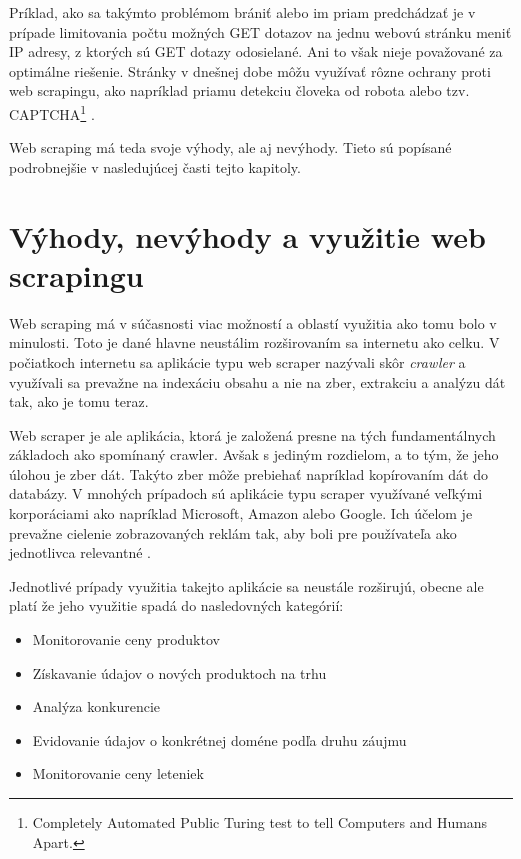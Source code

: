 Príklad, ako sa takýmto problémom brániť alebo im priam predchádzať je v prípade limitovania počtu možných GET dotazov na jednu webovú stránku meniť IP adresy, z ktorých sú GET dotazy odosielané. Ani to však nieje považované za optimálne riešenie. Stránky v dnešnej dobe môžu využívať rôzne ochrany proti web scrapingu, ako napríklad priamu detekciu človeka od robota alebo tzv. CAPTCHA\footnote{Completely Automated Public Turing test to tell Computers and Humans Apart.} \cite{JanCurna:online} .

Web scraping má teda svoje výhody, ale aj nevýhody. Tieto sú popísané podrobnejšie v nasledujúcej časti tejto kapitoly.

\section{Výhody, nevýhody a využitie web scrapingu}

Web scraping má v súčasnosti viac možností a oblastí využitia ako tomu bolo v minulosti. Toto je dané hlavne neustálim rozširovaním sa internetu ako celku. V počiatkoch internetu sa aplikácie typu web scraper nazývali skôr \textit{crawler} a využívali sa prevažne na indexáciu obsahu a nie na zber, extrakciu a analýzu dát tak, ako je tomu teraz. 

Web scraper je ale aplikácia, ktorá je založená presne na tých fundamentálnych základoch ako spomínaný crawler. Avšak s jediným rozdielom, a to tým, že jeho úlohou je zber dát. Takýto zber môže prebiehať napríklad kopírovaním dát do databázy. V mnohých prípadoch sú aplikácie typu scraper využívané veľkými korporáciami ako napríklad Microsoft, Amazon alebo Google. Ich účelom je prevažne cielenie zobrazovaných reklám tak, aby boli pre používateľa ako jednotlivca relevantné \cite{online:how_does_scraping_work}.

\bigskip

Jednotlivé prípady využitia takejto aplikácie sa neustále rozširujú, obecne ale platí že jeho využitie spadá do nasledovných kategórií:

\begin{itemize}
    \item {Monitorovanie ceny produktov}
    \item {Získavanie údajov o nových produktoch na trhu}
    \item {Analýza konkurencie}
    \item {Evidovanie údajov o konkrétnej doméne podľa druhu záujmu}
    \item {Monitorovanie ceny leteniek}
\end{itemize}

